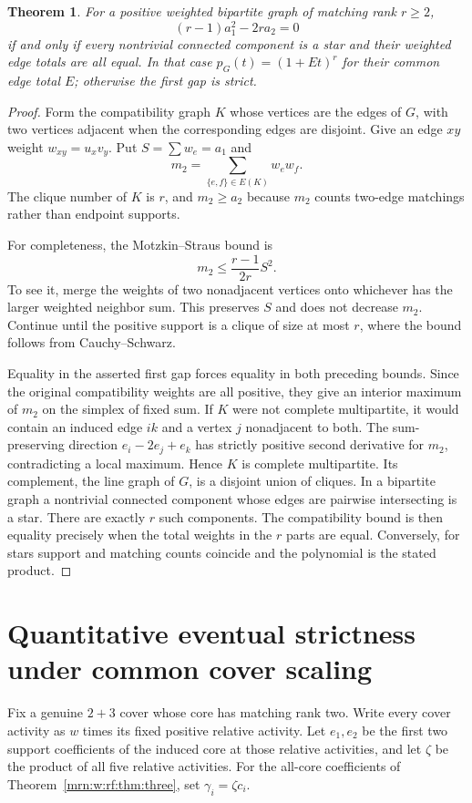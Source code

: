 \documentclass[11pt,a4paper]{article}
\newtheorem{theorem}{Theorem}[section]
\theoremstyle{remark}\newtheorem{remark}[theorem]{Remark}
\begin{document}
\begin{theorem}
For a positive weighted bipartite graph of matching rank $r\ge2$,
\[
 (r-1)a_1^2-2ra_2=0
\]
if and only if every nontrivial connected component is a star and their weighted edge totals are all equal. In that case $p_G(t)=(1+Et)^r$ for their common edge total $E$; otherwise the first gap is strict.
\end{theorem}
\begin{proof}
Form the compatibility graph $K$ whose vertices are the edges of $G$, with two vertices adjacent when the corresponding edges are disjoint. Give an edge $xy$ weight $w_{xy}=u_xv_y$. Put $S=\sum w_e=a_1$ and
\[
 m_2=\sum_{\{e,f\}\in E(K)}w_ew_f.
\]
The clique number of $K$ is $r$, and $m_2\ge a_2$ because $m_2$ counts two-edge matchings rather than endpoint supports.

For completeness, the Motzkin--Straus bound is
\[
 m_2\le\frac{r-1}{2r}S^2.
\]
To see it, merge the weights of two nonadjacent vertices onto whichever has the larger weighted neighbor sum. This preserves $S$ and does not decrease $m_2$. Continue until the positive support is a clique of size at most $r$, where the bound follows from Cauchy--Schwarz.

Equality in the asserted first gap forces equality in both preceding bounds. Since the original compatibility weights are all positive, they give an interior maximum of $m_2$ on the simplex of fixed sum. If $K$ were not complete multipartite, it would contain an induced edge $ik$ and a vertex $j$ nonadjacent to both. The sum-preserving direction $e_i-2e_j+e_k$ has strictly positive second derivative for $m_2$, contradicting a local maximum. Hence $K$ is complete multipartite. Its complement, the line graph of $G$, is a disjoint union of cliques. In a bipartite graph a nontrivial connected component whose edges are pairwise intersecting is a star. There are exactly $r$ such components. The compatibility bound is then equality precisely when the total weights in the $r$ parts are equal. Conversely, for stars support and matching counts coincide and the polynomial is the stated product.
\end{proof}
\section{Quantitative eventual strictness under common cover scaling}\label{mrn:w:rf:sec:scaling}
Fix a genuine $2+3$ cover whose core has matching rank two. Write every cover activity as $w$ times its fixed positive relative activity. Let $e_1,e_2$ be the first two support coefficients of the induced core at those relative activities, and let $\zeta$ be the product of all five relative activities. For the all-core coefficients of Theorem~\ref{mrn:w:rf:thm:three}, set $\gamma_i=\zeta c_i$.
\end{document}
